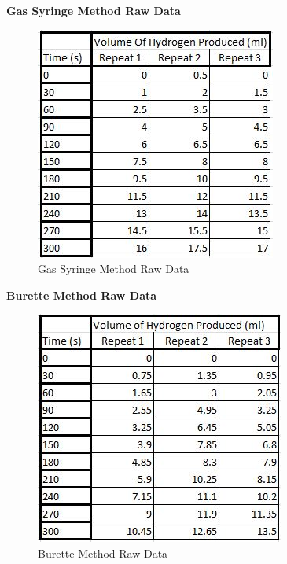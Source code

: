 \textbf{Gas Syringe Method Raw Data}\begin{figure}[H]
    \includegraphics[width=\textwidth]{./preliminarywork/images/GasSyringeRawData.jpg}
    \caption{Gas Syringe Method Raw Data} \label{fig:GasSyringeRawData}
\end{figure}

\textbf{Burette Method Raw Data}\begin{figure}[H]
    \includegraphics[width=\textwidth]{./preliminarywork/images/BuretteRawData.jpg}
    \caption{Burette Method Raw Data} \label{fig:BuretteRawData}
\end{figure}

